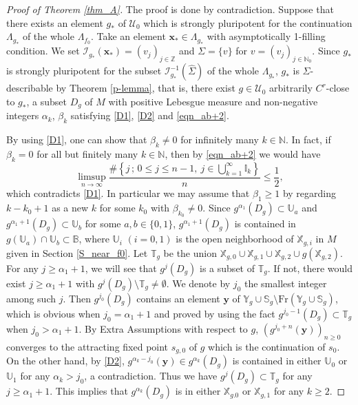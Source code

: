 \documentclass{amsart}
\theoremstyle{plain}
\theoremstyle{definition}
\theoremstyle{remark}
\numberwithin{equation}{section}
\def\xx{\mathbb{X}}
\def\yy{\mathbb{Y}}
\def\uu{\mathbb{U}}
\def\bx{{\boldsymbol{x}}}
\def\by{{\boldsymbol{y}}}
\begin{document}
\begin{proof}[Proof of Theorem \ref{thm_A}]
The proof is done by contradiction.
Suppose that there exists an element $g_*$ of $\mathcal{U}_0$ which is strongly 
pluripotent for the continuation $\Lambda_{g_*}$ of the whole $\Lambda_{f_0}$.
Take an element $\bx_*\in \Lambda_{g_*}$ with asymptotically 1-filling condition.
We set $\mathcal{I}_{g_*}(\bx_*)=(v_j)_{j\in \mathbb{Z}}$ and $\Sigma=\{v\}$ 
for $v=(v_j)_{j\in \mathbb{N}_0}$.
Since $g_*$ is strongly pluripotent for the subset $\mathcal{I}_{g_*}^{-1}(\widehat\Sigma)$ of the whole $\Lambda_{g_*}$, 
$g_*$ is $\Sigma$-describable by Theorem \ref{p-lemma}, that is,  
there exist $g\in \mathcal{U}_0$ arbitrarily $C^r$-close to $g_*$,  
a subset $D_g$ of $M$ with positive Lebesgue measure and 
non-negative integers $\alpha_k$, $\beta_k$ satisfying \eqref{D1}, \eqref{D2} 
and \eqref{eqn_ab+2}.


By using \eqref{D1}, one can show that $\beta_{k}\neq 0$ for infinitely many $k\in \mathbb{N}$.
In fact, if $\beta_{k}=0$ for all but finitely many $k\in \mathbb{N}$, then by \eqref{eqn_ab+2} 
we would have 
\[
\limsup _{n\rightarrow \infty} \frac{\#\left\{j\,;\, 0\le j \le n-1,\ j \in \bigcup _{k=1}^\infty \mathbb{I}_k\right\}}{n}\leq \frac12,
\]
which contradicts \eqref{D1}.
In particular we may assume that $\beta_1\geq 1$ by regarding $k-k_0+1$ as a new $k$ for some $k_0$ with 
$\beta_{k_0}\neq 0$.
Since $g^{\alpha_1}(D_g)\subset \uu_a$ and $g^{\alpha_1+1}(D_g)\subset \uu_b$ for some $a,b\in \{0,1\}$, 
$g^{\alpha_1+1}(D_g)$ is contained in $g(\uu_a)\cap \uu_b\subset \mathbb{B}$, 
where $\mathbb{U}_i$ $(i=0,1)$ is the open neighborhood of $\xx_{g,i}$ in $M$ given in Section \ref{S_near_f0}.
Let $\mathbb{T}_g$ be the union $\xx_{g,0}\cup \xx_{g,1}\cup \xx_{g,2}\cup g(\xx_{g,2})$. 
For any $j\geq \alpha_1+1$, we will see that $g^j(D_g)$ is a subset of $\mathbb{T}_g$.
If not, there would exist $j\geq \alpha_1+1$ with $g^j(D_g)\setminus \mathbb{T}_g\neq \emptyset$.
We denote by $j_0$ the smallest integer among such $j$. 
Then $g^{j_0}(D_g)$ contains an element $\by$ of $\yy_g\cup \mathbb{S}_g\setminus 
\mathrm{Fr}(\yy_g\cup \mathbb{S}_g)$, 
which is obvious when $j_0=\alpha_1+1$ and proved by using the fact $g^{j_0-1}(D_g)\subset \mathbb{T}_g$ 
when $j_0>\alpha_1+1$.
By Extra Assumptions with respect to $g$, $(g^{j_0+n}(\by))_{n\geq 0}$ converges to the attracting fixed point $s_{g,0}$ of $g$ which is the continuation of $s_0$.
On the other hand, by \eqref{D2}, $g^{\alpha_k-j_0}(\by)\in g^{\alpha_k}(D_g)$ 
is contained in either $\mathbb{U}_{0}$ or $\mathbb{U}_{1}$ for any $\alpha_k>j_0$, a contradiction.
Thus we have $g^j(D_g)\subset \mathbb{T}_g$ for any $j\geq \alpha_1+1$.
This implies that $g^{\alpha_k}(D_g)$ is in either $\xx_{g.0}$ or $\xx_{g,1}$ for any $k\geq 2$.






\end{proof}
\end{document}

